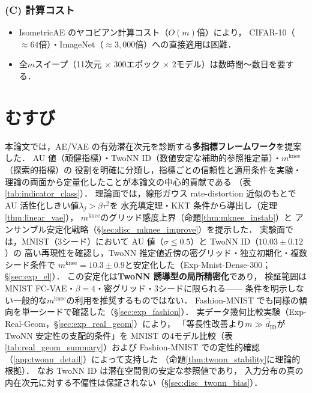\documentclass[11pt,a4paper]{jsarticle}
\newcommand{\mknee}{m^{\mathrm{knee}}}
\begin{document}
\subsubsection*{(C) 計算コスト}

\begin{itemize}
  \item IsometricAE のヤコビアン計算コスト（$O(m)$倍）により，
        CIFAR-10（$\approx 64$倍）・ImageNet（$\approx 3{,}000$倍）への直接適用は困難．
  \item 全$m$スイープ（11次元 $\times$ 300エポック $\times$ 2モデル）は数時間〜数日を要する．
\end{itemize}

\section{むすび}\label{sec:conclusion}

本論文では，AE/VAE の有効潜在次元を診断する\textbf{多指標フレームワーク}を提案した．
AU 値（頑健指標）・TwoNN ID（数値安定な補助的参照推定量）・$\mknee$（探索的指標）の
役割を明確に分類し，指標ごとの信頼性と適用条件を実験・理論の両面から定量化したことが本論文の中心的貢献である
（表\ref{tab:indicator_class}）．
理論面では，線形ガウス rate-distortion 近似のもとで AU 活性化しきい値$\lambda_j > \beta\tau^2$を
水充填定理・KKT 条件から導出し（定理\ref{thm:linear_vae}），
$\mknee$のグリッド感度上界（命題\ref{thm:mknee_instab}）と
アンサンブル安定化戦略（§\ref{sec:disc_mknee_improve}）を提示した．
実験面では，MNIST（3シード）において AU 値（$\sigma \leq 0.5$）と TwoNN ID（$10.03 \pm 0.12$）の
高い再現性を確認し，TwoNN 推定値近傍の密グリッド・独立初期化・複数シード条件で
$\mknee = 10.3 \pm 0.9$と安定化した（Exp-Mnist-Dense-300；§\ref{sec:exp_el}）．
この安定化は\textbf{TwoNN 誘導型の局所精密化}であり，
検証範囲は MNIST FC-VAE・$\beta = 4$・密グリッド・3シードに限られる——
条件を明示しない一般的な$\mknee$の利用を推奨するものではない．
Fashion-MNIST でも同様の傾向を単一シードで確認した（§\ref{sec:exp_fashion}）．
実データ幾何比較実験（Exp-Real-Geom，§\ref{sec:exp_real_geom}）により，
「等長性改善より$m \gg \hat{d}_\mathrm{ID}$が TwoNN 安定性の支配的条件」を
MNIST の4モデル比較（表\ref{tab:real_geom_summary}）および
Fashion-MNIST での定性的確認（\ref{app:twonn_detail}）によって支持した
（命題\ref{thm:twonn_stability}に理論的根拠）．
なお TwoNN ID は潜在空間側の安定な参照値であり，
入力分布の真の内在次元に対する不偏性は保証されない（§\ref{sec:disc_twonn_bias}）．
\end{document}
